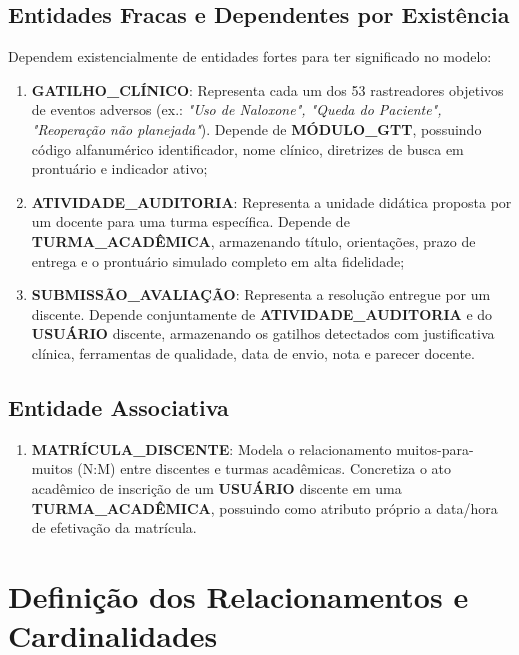 \subsection{Entidades Fracas e Dependentes por Existência}
Dependem existencialmente de entidades fortes para ter significado no modelo:
\begin{enumerate}
    \item \textbf{GATILHO\_CLÍNICO}: Representa cada um dos 53 rastreadores objetivos de eventos adversos (ex.: \textit{"Uso de Naloxone", "Queda do Paciente", "Reoperação não planejada"}). Depende de \textbf{MÓDULO\_GTT}, possuindo código alfanumérico identificador, nome clínico, diretrizes de busca em prontuário e indicador ativo;
    \item \textbf{ATIVIDADE\_AUDITORIA}: Representa a unidade didática proposta por um docente para uma turma específica. Depende de \textbf{TURMA\_ACADÊMICA}, armazenando título, orientações, prazo de entrega e o prontuário simulado completo em alta fidelidade;
    \item \textbf{SUBMISSÃO\_AVALIAÇÃO}: Representa a resolução entregue por um discente. Depende conjuntamente de \textbf{ATIVIDADE\_AUDITORIA} e do \textbf{USUÁRIO} discente, armazenando os gatilhos detectados com justificativa clínica, ferramentas de qualidade, data de envio, nota e parecer docente.
\end{enumerate}

\subsection{Entidade Associativa}
\begin{enumerate}
    \item \textbf{MATRÍCULA\_DISCENTE}: Modela o relacionamento muitos-para-muitos (N:M) entre discentes e turmas acadêmicas. Concretiza o ato acadêmico de inscrição de um \textbf{USUÁRIO} discente em uma \textbf{TURMA\_ACADÊMICA}, possuindo como atributo próprio a data/hora de efetivação da matrícula.
\end{enumerate}

\section{Definição dos Relacionamentos e Cardinalidades}
\label{sec_relacionamentos_mer}

